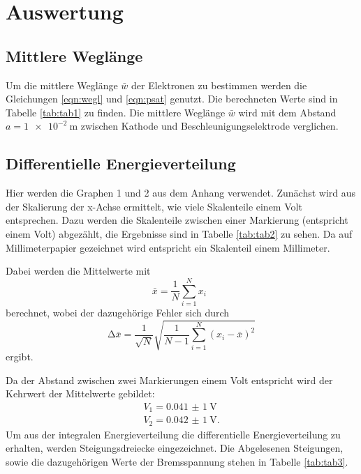 \section{Auswertung}
\label{sec:Auswertung}
\subsection{Mittlere Weglänge}

Um die mittlere Weglänge $\bar{w}$ der Elektronen zu bestimmen werden die Gleichungen
\ref{eqn:wegl} und \ref{eqn:psat} genutzt. Die berechneten Werte sind in Tabelle
\ref{tab:tab1} zu finden. Die mittlere Weglänge $\bar{w}$ wird mit dem Abstand
$a=\SI{1e-2}{\m}$ zwischen
Kathode und Beschleunigungselektrode verglichen.



\subsection{Differentielle Energieverteilung}
Hier werden die Graphen 1 und 2 aus dem Anhang verwendet.
Zunächst wird aus der Skalierung der x-Achse ermittelt, wie viele
Skalenteile einem Volt entsprechen. Dazu werden die Skalenteile zwischen einer
Markierung (entspricht einem Volt) abgezählt, die Ergebnisse sind in
Tabelle \ref{tab:tab2} zu sehen. Da auf Millimeterpapier gezeichnet wird entspricht
ein Skalenteil einem Millimeter.


Dabei werden die Mittelwerte mit
\begin{equation}
  \bar{x} = \frac{1}{N} \sum_{i=1}^{N} x_i \: \:
  \label{eqn:mit}
\end{equation}
berechnet, wobei der dazugehörige Fehler sich durch
\begin{equation}
  \increment \bar{x} = \frac{1}{\sqrt{N}} \sqrt{ \frac{1}{N-1} \sum_{i=1}^N
  (x_i - \bar{x})^2}
  \label{eqn:mitf}
\end{equation}
ergibt.

Da der Abstand zwischen zwei Markierungen einem Volt entspricht wird der
Kehrwert der Mittelwerte gebildet:
\begin{align*}
  V_1=\SI{0,041(1)}{\V}\\
  V_2=\SI{0,042(1)}{\V}.
\end{align*}
Um aus der integralen
Energieverteilung die differentielle Energieverteilung zu erhalten, werden
Steigungsdreiecke eingezeichnet. Die Abgelesenen Steigungen, sowie
die dazugehörigen Werte der Bremsspannung stehen in Tabelle \ref{tab:tab3}.



